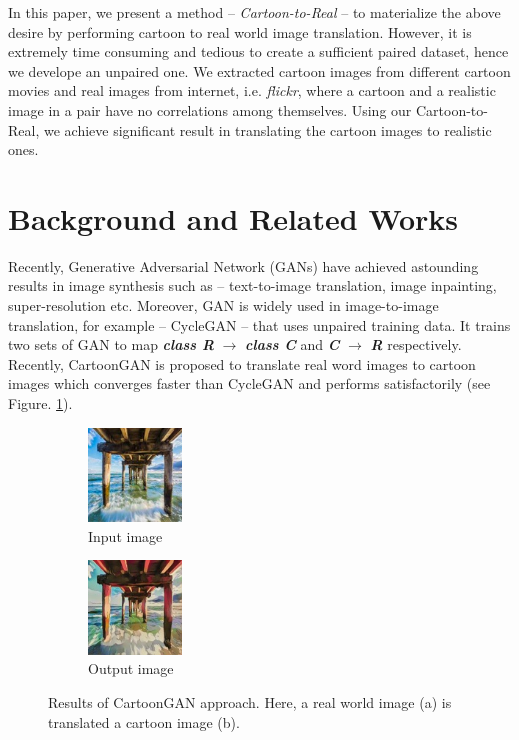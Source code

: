 \documentclass[conference,compsoc]{IEEEtran}
\begin{document}
In this paper, we present a method -- \textit{Cartoon-to-Real} -- to materialize the above desire by performing cartoon to real world image translation. However, it is extremely time consuming and tedious to create a sufficient paired dataset, hence we develope an unpaired one. We extracted cartoon images from different cartoon movies and real images from internet, i.e. \textit{flickr}, where a cartoon and a realistic image in a pair have no correlations among themselves. Using our Cartoon-to-Real, we achieve significant result in translating the cartoon images to realistic ones.

\section{Background and Related Works}
Recently, Generative Adversarial Network (GANs) \cite{goodfellow2014generative} have achieved astounding results in image synthesis such as -- text-to-image translation\cite{DBLP:journals/corr/ReedAYLSL16}, image inpainting\cite{DBLP:journals/corr/YehCLHD16}, super-resolution\cite{DBLP:journals/corr/LedigTHCATTWS16} etc. Moreover, GAN is widely used in image-to-image translation, for example -- CycleGAN\cite{zhu2017unpaired} -- that uses unpaired training data. It trains two sets of GAN to map \textbf{\textit{class R}} $\rightarrow$ \textbf{\textit{class C}} and \textbf{\textit{C} }$\rightarrow$ \textbf{\textit{R}} respectively. Recently, CartoonGAN\cite{Chen2018CartoonGANGA} is proposed to translate real word images to cartoon images which converges faster than CycleGAN\cite{zhu2017unpaired} and performs satisfactorily (see Figure. \ref{fig:carto}). 

\begin{figure}[h!]
 \centering
 \begin{subfigure}[b]{0.4\linewidth}
   \includegraphics[width=\linewidth, height= 2.5cm]{in2.jpg}
   \caption{Input image}
  \end{subfigure}
  \begin{subfigure}[b]{0.4\linewidth}
    \includegraphics[width=\linewidth, height = 2.5cm]{in2_Hayao.jpg}
    \caption{Output image}
  \end{subfigure}
  \caption{Results of CartoonGAN\cite{Chen2018CartoonGANGA} approach. Here, a real world image (a) is translated a cartoon image (b).}
  \label{fig:carto}
\end{figure}
\end{document}
